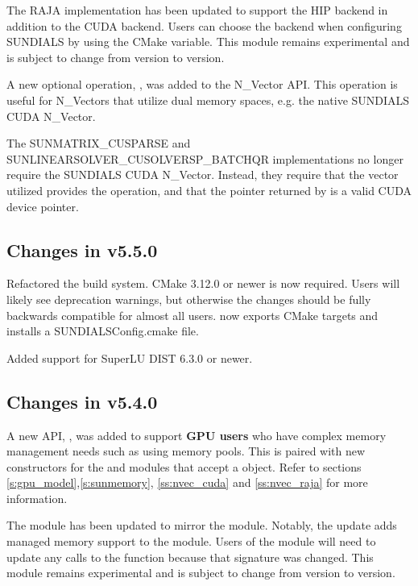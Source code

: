The RAJA {\nvector} implementation has been updated to support the HIP backend
in addition to the CUDA backend. Users can choose the backend when configuring
SUNDIALS by using the  CMake variable. This module
remains experimental and is subject to change from version to version.

A new optional operation, , was added to the N\_Vector
API. This operation is useful for N\_Vectors that utilize dual memory spaces,
e.g. the native SUNDIALS CUDA N\_Vector.

The SUNMATRIX\_CUSPARSE and SUNLINEARSOLVER\_CUSOLVERSP\_BATCHQR implementations
no longer require the SUNDIALS CUDA N\_Vector. Instead, they require that the vector
utilized provides the  operation, and that the pointer
returned by  is a valid CUDA device pointer.

\subsection*{Changes in v5.5.0}

Refactored the {\sundials} build system. CMake 3.12.0 or newer is now required.
Users will likely see deprecation warnings, but otherwise the changes
should be fully backwards compatible for almost all users. {\sundials}
now exports CMake targets and installs a SUNDIALSConfig.cmake file.

Added support for SuperLU DIST 6.3.0 or newer.


\subsection*{Changes in v5.4.0}

A new API, , was added to support \textbf{GPU users} who
have complex memory management needs such as using memory pools. This is paired
with new constructors for the {\nveccuda} and {\nvecraja} modules that accept a
 object. Refer to sections
\ref{s:gpu_model},\ref{s:sunmemory}, \ref{ss:nvec_cuda} and \ref{ss:nvec_raja}
for more information.

The  module has been updated to mirror the  module.
Notably, the update adds managed memory support to the  module.
Users of the module will need to update any calls to the  function
because that signature was changed. This module remains experimental and is
subject to change from version to version.

